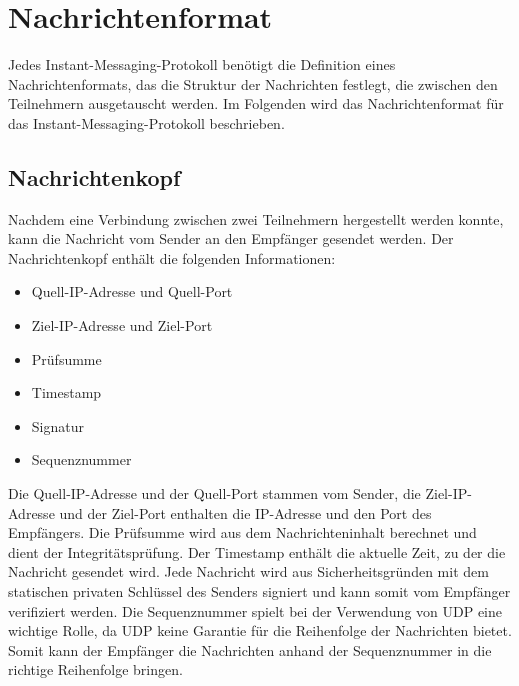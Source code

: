 \section{Nachrichtenformat}
\label{sec:nachrichtenformat}


Jedes Instant-Messaging-Protokoll benötigt die Definition eines Nachrichtenformats, das die Struktur der Nachrichten festlegt, die zwischen den Teilnehmern ausgetauscht werden. Im Folgenden wird das Nachrichtenformat für das Instant-Messaging-Protokoll beschrieben.

\subsection{Nachrichtenkopf}

Nachdem eine Verbindung zwischen zwei Teilnehmern hergestellt werden konnte, kann die Nachricht vom Sender an den Empfänger gesendet werden. Der Nachrichtenkopf enthält die folgenden Informationen:

\begin{itemize}
    \item Quell-IP-Adresse und Quell-Port
    \item Ziel-IP-Adresse und Ziel-Port
    \item Prüfsumme
    \item Timestamp
    \item Signatur
    \item Sequenznummer
\end{itemize}

\noindent Die Quell-IP-Adresse und der Quell-Port stammen vom Sender, die Ziel-IP-Adresse und der Ziel-Port enthalten die IP-Adresse und den Port des Empfängers. Die Prüfsumme wird aus dem Nachrichteninhalt berechnet und dient der Integritätsprüfung. Der Timestamp enthält die aktuelle Zeit, zu der die Nachricht gesendet wird. Jede Nachricht wird aus Sicherheitsgründen mit dem statischen privaten Schlüssel des Senders signiert und kann somit vom Empfänger verifiziert werden. Die Sequenznummer spielt bei der Verwendung von UDP eine wichtige Rolle, da UDP keine Garantie für die Reihenfolge der Nachrichten bietet. Somit kann der Empfänger die Nachrichten anhand der Sequenznummer in die richtige Reihenfolge bringen.

